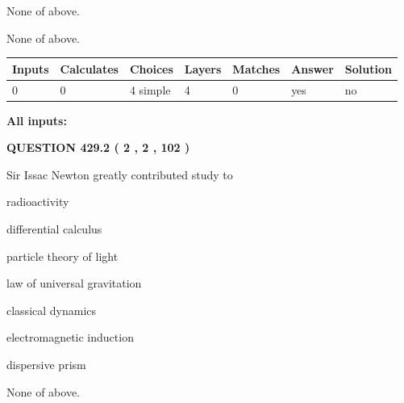 \documentclass[12pt]{article}
\begin{document}
 
 None of above.
 
 
\noindent{}
 
 
 None of above.
 
 
\noindent{}
 
 
   
   
   
   
\noindent\begin{tabular}{|l|l|l|l|l|l|l|}
 \hline
Inputs & Calculates & Choices & Layers & Matches & Answer & Solution \\ \hline
 0  & 
 0  & 
 4
  simple  
  & 
 4  & 
 0  & 
  yes & 
  no 
  \\ \hline
 \end{tabular}
   
   
   
   
\noindent{}
   
   
   
   
\noindent\vspace{0.1in}\hspace{-0.08in} {\textbf{\Large{All inputs: }}}
   
   
  
\vspace{0.2in}
  
{\textbf{\Large{QUESTION
429.2 
 ( 2 , 2 , 102 )
}}}
  
  
Sir Issac Newton greatly contributed study to
 
 
radioactivity
 
 
differential calculus
 
 
particle theory of light
 
 
law of universal gravitation
 
 
classical dynamics
 
 
electromagnetic induction
 
 
dispersive prism
 
 
 None of above.
 
 
\noindent{}
 
\end{document}

